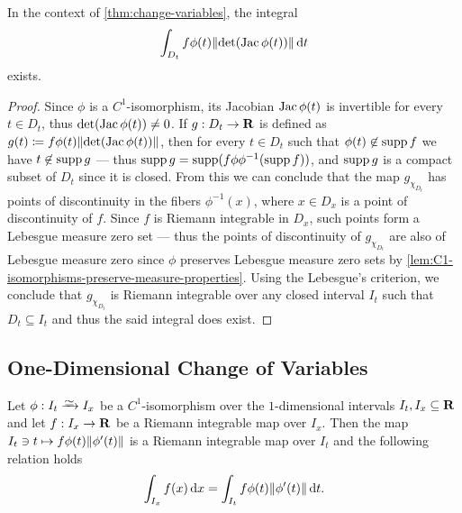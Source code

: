 \begin{corollary}
\label{cor:existence-right-int-change-variables}
In the context of \cref{thm:change-variables}, the integral
\[
\int_{D_t} f\phi(t) \lVert\det(\operatorname{Jac} \phi(t))\rVert\, \mathrm{d} t
\]
exists.
\end{corollary}

\begin{proof}
Since \(\phi\) is a \(C^1\)-isomorphism, its Jacobian \(\operatorname{Jac} \phi(t)\) is invertible
for every \(t \in D_t\), thus \(\det(\operatorname{Jac} \phi(t)) \neq 0\). If \(g: D_t \to \mathbf{R}\)
is defined as \(g(t) \coloneq f \phi(t) \lVert\det(\operatorname{Jac} \phi(t))\rVert\), then for
every \(t \in D_t\) such that \(\phi(t) \not\in \operatorname{supp} f\) we have \(t \not\in
\operatorname{supp} g\) --- thus \(\operatorname{supp} g = \operatorname{supp}(f \phi \phi^{-1}(\operatorname{supp} f))\), and \(\operatorname{supp}
g\) is a compact subset of \(D_t\) since it is closed. From this we can conclude
that the map \(g_{\chi_{D_t}}\) has points of discontinuity in the fibers
\(\phi^{-1}(x)\), where \(x \in D_x\) is a point of discontinuity of
\(f\). Since \(f\) is Riemann integrable in \(D_x\), such points form a
Lebesgue measure zero set --- thus the points of discontinuity of
\(g_{\chi_{D_t}}\) are also of Lebesgue measure zero since \(\phi\) preserves
Lebesgue measure zero sets by
\cref{lem:C1-isomorphisms-preserve-measure-properties}. Using the Lebesgue's
criterion, we conclude that \(g_{\chi_{D_t}}\) is Riemann integrable over
any closed interval \(I_t\) such that \(D_t \subseteq I_t\) and thus the said
integral does exist.
\end{proof}

\subsection{One-Dimensional Change of Variables}

\begin{lemma}
\label{lem:change-variables-one-dimensional}
Let \(\phi: I_t \isoto I_x\) be a \(C^1\)-isomorphism over the \(1\)-dimensional
intervals \(I_t, I_x \subseteq \mathbf{R}\) and let \(f: I_x \to \mathbf{R}\) be a Riemann
integrable map over \(I_x\). Then the map \(I_t \ni t \mapsto f \phi(t)
\lVert\phi'(t)\rVert\) is a Riemann integrable map over \(I_t\) and the following
relation holds
\[
  \int_{I_x} f(x)\, \mathrm{d} x = \int_{I_t} f \phi(t) \lVert\phi'(t)\rVert\, \mathrm{d} t.
\]
\end{lemma}

